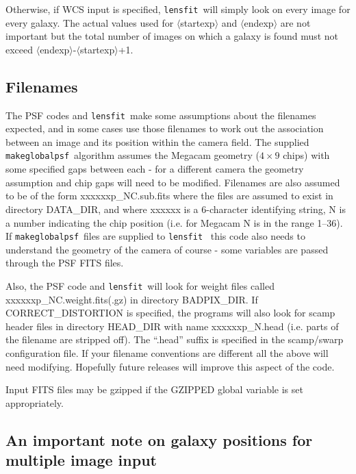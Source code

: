 \documentclass{article}
\def\lensfit{{\tt lensfit}\ }
\def\makeglobalpsf{{\tt makeglobalpsf}\ }
\def\<{{$\langle$}}
\def\>{{$\rangle$}}
\begin{document}
Otherwise, if WCS input is specified, \lensfit will simply look on every image for every galaxy.
The actual values used for \<startexp\> and \<endexp\> are not important but
the total number of images on which a galaxy is found must not exceed 
\<endexp\>-\<startexp\>+1.  

\subsection{Filenames}
The PSF codes and \lensfit make some assumptions about the filenames expected, and in some cases
use those filenames to work out the association between an image and its position within the
camera field.  The supplied \makeglobalpsf algorithm assumes the Megacam geometry ($4\times 9$ chips)
with some specified gaps between each - for a different camera the geometry assumption and chip
gaps will need to be modified.  Filenames are also assumed to be of the form xxxxxxp\_NC.sub.fits
where the files are assumed to exist in directory DATA\_DIR, and
where xxxxxx is a 6-character identifying string, N is a number indicating the chip position
(i.e. for Megacam N is in the range 1--36).  If \makeglobalpsf files are supplied to \lensfit
this code also needs to understand the geometry of the camera of course - some variables are
passed through the PSF FITS files.

Also, the PSF code and \lensfit will look for weight files
called xxxxxxp\_NC.weight.fits(.gz) in directory BADPIX\_DIR.  If CORRECT\_DISTORTION is specified,
the programs will also look for scamp header files in directory HEAD\_DIR with name
xxxxxxp\_N.head (i.e. parts of the filename are stripped off).  The ``.head'' suffix is specified
in the scamp/swarp configuration file.  If your filename conventions are different all the above will
need modifying.  Hopefully future releases will improve this aspect of the code.

Input FITS files may be gzipped if the GZIPPED global variable is set appropriately.

\subsection{An important note on galaxy positions for multiple image input}
\end{document}
